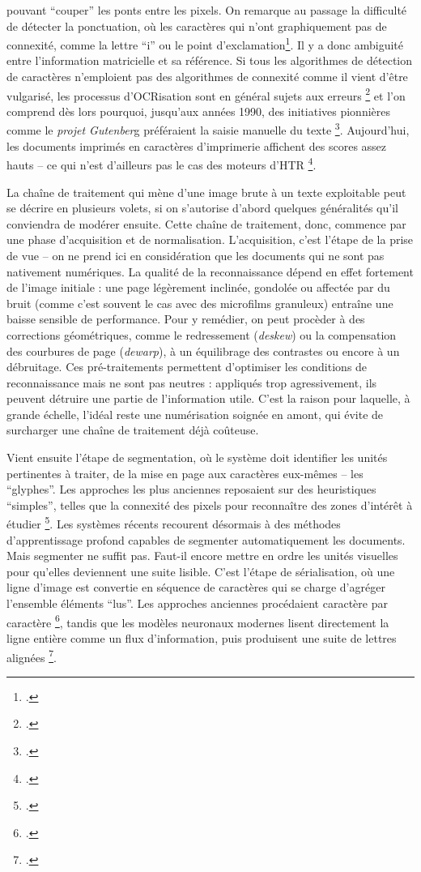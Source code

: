 pouvant \enquote{couper} les ponts entre les pixels. On remarque au passage la difficulté de détecter la ponctuation, où les caractères qui n'ont graphiquement pas de connexité, comme la lettre \enquote{i} ou le point d'exclamation\footcite[][]{lecolinet}. Il y a donc ambiguité entre l'information matricielle et sa référence. Si tous les algorithmes de détection de caractères n'emploient pas des algorithmes de connexité comme il vient d'être vulgarisé, les processus d'OCRisation sont en général sujets aux erreurs \footcite[][]{chiron} et l’on comprend dès lors pourquoi, jusqu’aux années 1990, des initiatives pionnières comme le \emph{projet Gutenber}g préféraient la saisie manuelle du texte \footcite[][]{bermesbook}. Aujourd'hui, les documents imprimés en caractères d'imprimerie affichent des scores assez hauts -- ce qui n'est d'ailleurs pas le cas des moteurs d'HTR \footcite[][]{chiron}.

La chaîne de traitement qui mène d’une image brute à un texte exploitable peut se décrire en plusieurs volets, si on s'autorise d'abord quelques généralités qu'il conviendra de modérer ensuite. Cette chaîne de traitement, donc, commence par une phase d’acquisition et de normalisation. L'acquisition, c'est l'étape de la prise de vue  -- on ne prend ici en considération que les documents qui ne sont pas nativement numériques. La qualité de la reconnaissance dépend en effet fortement de l’image initiale : une page légèrement inclinée, gondolée ou affectée par du bruit (comme c’est souvent le cas avec des microfilms granuleux) entraîne une baisse sensible de performance. Pour y remédier, on peut procèder à des corrections géométriques, comme le redressement (\emph{deskew}) ou la compensation des courbures de page (\emph{dewarp}), à un équilibrage des contrastes ou encore à un débruitage. Ces pré-traitements permettent d’optimiser les conditions de reconnaissance mais ne sont pas neutres : appliqués trop agressivement, ils peuvent détruire une partie de l’information utile. C’est la raison pour laquelle, à grande échelle, l’idéal reste une numérisation soignée en amont, qui évite de surcharger une chaîne de traitement déjà coûteuse.

Vient ensuite l’étape de segmentation, où le système doit identifier les unités pertinentes à traiter, de la mise en page aux caractères eux-mêmes -- les \enquote{glyphes}.  Les approches les plus anciennes reposaient sur des heuristiques \enquote{simples}, telles que  la connexité des pixels pour reconnaître des zones d'intérêt à étudier \footcite[][]{lecolinet}. Les systèmes récents recourent désormais à des méthodes d’apprentissage profond capables de segmenter automatiquement les documents. Mais segmenter ne suffit pas. Faut-il encore mettre en ordre les unités visuelles pour qu’elles deviennent une suite lisible. C’est l’étape de sérialisation, où une ligne d’image est convertie en séquence de caractères qui se charge d'agréger l'ensemble éléments \enquote{lus}. Les approches anciennes procédaient caractère par caractère \footcite[][]{lecolinet}, tandis que les modèles neuronaux modernes lisent directement la ligne entière comme un flux d’information, puis produisent une suite de lettres alignées \footcite[][]{graves}.

